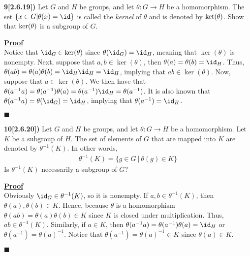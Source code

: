 \documentclass[12pt,a4paper]{article}
\newcommand{\prob}[2]{\textbf{#1)} #2}
\newenvironment{proof}
{
\textbf{\underline{Proof}} \\
}
{
\begin{flushright}
$\blacksquare$
\end{flushright}}
\begin{document}
\prob{9[2.6.19]}{Let $G$ and $H$ be groups, and let $\theta: G \rightarrow H$ be a homomorphism. The set $\{x \in G | \theta(x)=\id \}$ is called the \textit{kernel} of $\theta$ and is denoted by ${\rm ket}(\theta)$. Show that ${\rm ker}(\theta)$ is a subgroup of $G$.}

\begin{proof}
Notice that $\id_G \in \ker(\theta)$ since $\theta(\id_G) = \id_H$, meaning that $\ker(\theta)$ is nonempty. Next, suppose that $a,b \in \ker(\theta)$, then $\theta(a) = \theta(b) = \id_H$. Thus, $\theta(ab) = \theta(a)\theta(b) = \id_H\id_H = \id_H$, implying that $ab \in \ker(\theta)$. Now, suppose that $a \in \ker(\theta)$. We then have that $\theta(a^{-1}a) = \theta(a^{-1})\theta(a) = \theta(a^{-1})\id_H = \theta(a^{-1})$. It is also known that $\theta(a^{-1}a) = \theta(\id_G) = \id_H$, implying that $\theta(a^{-1}) = \id_H$.
\end{proof}

\prob{10[2.6.20]}{Let $G$ and $H$ be groups, and let $\theta: G \rightarrow H$ be a homomorphism. Let $K$ be a subgroup of $H$. The set of elements of $G$ that are mapped into $K$ are denoted by $\theta^{-1}(K)$. In other words,
\begin{align*}
\theta^{-1}(K) = \{g \in G ~|~ \theta(g) \in K \}
\end{align*}
Is $\theta^{-1}(K)$ necessarily a subgroup of $G$?}

\begin{proof}
Obviously $\id_G \in \theta^{-1}(K)$, so it is nonempty. If $a,b \in \theta^{-1}(K)$, then $\theta(a),\theta(b) \in K$. Hence, because $\theta$ is a homomorphism $\theta(ab) = \theta(a)\theta(b) \in K$ since $K$ is closed under multiplication. Thus, $ab \in \theta^{-1}(K)$. Similarly, if $a \in K$, then $\theta(a^{-1}a) = \theta(a^{-1})\theta(a) = \id_H$ or $\theta(a^{-1}) = \theta(a)^{-1}$. Notice that $\theta(a^{-1}) = \theta(a)^{-1} \in K$ since $\theta(a) \in K$.
\end{proof}
\end{document}
